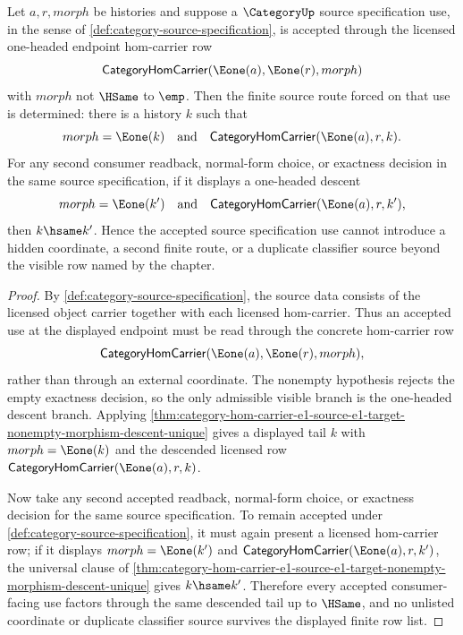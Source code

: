 \begin{corollary}
\label{cor:category-source-specification-endpoint-determinacy}
Let $a,r,morph$ be histories and suppose a $\CategoryUp$ source specification use, in the sense of \autoref{def:category-source-specification}, is accepted through the licensed one-headed endpoint hom-carrier row
$$
\mathsf{CategoryHomCarrier}(\Eone(a),\Eone(r),morph)
$$
with $morph$ not $\HSame$ to $\emp$. Then the finite source route forced on that use is determined: there is a history $k$ such that
$$
morph=\Eone(k)
\quad\text{and}\quad
\mathsf{CategoryHomCarrier}(\Eone(a),r,k).
$$
For any second consumer readback, normal-form choice, or exactness decision in the same source specification, if it displays a one-headed descent
$$
morph=\Eone(k')
\quad\text{and}\quad
\mathsf{CategoryHomCarrier}(\Eone(a),r,k'),
$$
then $k\hsame k'$. Hence the accepted source specification use cannot introduce a hidden coordinate, a second finite route, or a duplicate classifier source beyond the visible row named by the chapter.
\end{corollary}
\begin{proof}
By \autoref{def:category-source-specification}, the source data consists of the licensed object carrier together with each licensed hom-carrier. Thus an accepted use at the displayed endpoint must be read through the concrete hom-carrier row
$$
\mathsf{CategoryHomCarrier}(\Eone(a),\Eone(r),morph),
$$
rather than through an external coordinate. The nonempty hypothesis rejects the empty exactness decision, so the only admissible visible branch is the one-headed descent branch. Applying \autoref{thm:category-hom-carrier-e1-source-e1-target-nonempty-morphism-descent-unique} gives a displayed tail $k$ with $morph=\Eone(k)$ and the descended licensed row $\mathsf{CategoryHomCarrier}(\Eone(a),r,k)$.

Now take any second accepted readback, normal-form choice, or exactness decision for the same source specification. To remain accepted under \autoref{def:category-source-specification}, it must again present a licensed hom-carrier row; if it displays $morph=\Eone(k')$ and $\mathsf{CategoryHomCarrier}(\Eone(a),r,k')$, the universal clause of \autoref{thm:category-hom-carrier-e1-source-e1-target-nonempty-morphism-descent-unique} gives $k\hsame k'$. Therefore every accepted consumer-facing use factors through the same descended tail up to $\HSame$, and no unlisted coordinate or duplicate classifier source survives the displayed finite row list.
\end{proof}
